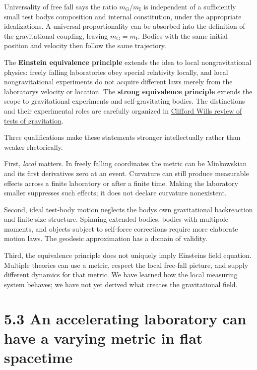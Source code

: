 \documentclass[
  11pt,
  letterpaper,
  oneside,
  openany]{scrbook}
\begin{document}
Universality of free fall says the ratio
\(m_{\mathrm{G}}/m_{\mathrm{I}}\) is independent of a sufficiently small
test body\textquotesingle s composition and internal constitution, under
the appropriate idealizations. A universal proportionality can be
absorbed into the definition of the gravitational coupling, leaving
\(m_{\mathrm{G}}=m_{\mathrm{I}}\). Bodies with the same initial position
and velocity then follow the same trajectory.

The \textbf{Einstein equivalence principle} extends the idea to local
nongravitational physics: freely falling laboratories obey special
relativity locally, and local nongravitational experiments do not
acquire different laws merely from the laboratory\textquotesingle s
velocity or location. The \textbf{strong equivalence principle} extends
the scope to gravitational experiments and self-gravitating bodies. The
distinctions and their experimental roles are carefully organized in
\href{https://arxiv.org/abs/1403.7377}{Clifford Will\textquotesingle s
review of tests of gravitation}.

Three qualifications make these statements stronger intellectually
rather than weaker rhetorically.

First, \emph{local} matters. In freely falling coordinates the metric
can be Minkowskian and its first derivatives zero at an event. Curvature
can still produce measurable effects across a finite laboratory or after
a finite time. Making the laboratory smaller suppresses such effects; it
does not declare curvature nonexistent.

Second, ideal test-body motion neglects the body\textquotesingle s own
gravitational backreaction and finite-size structure. Spinning extended
bodies, bodies with multipole moments, and objects subject to self-force
corrections require more elaborate motion laws. The geodesic
approximation has a domain of validity.

Third, the equivalence principle does not uniquely imply
Einstein\textquotesingle s field equation. Multiple theories can use a
metric, respect the local free-fall picture, and supply different
dynamics for that metric. We have learned how the local measuring system
behaves; we have not yet derived what creates the gravitational field.

\hypertarget{an-accelerating-laboratory-can-have-a-varying-metric-in-flat-spacetime}{%
\section{5.3 An accelerating laboratory can have a varying metric in
flat
spacetime}\label{an-accelerating-laboratory-can-have-a-varying-metric-in-flat-spacetime}}
\end{document}
